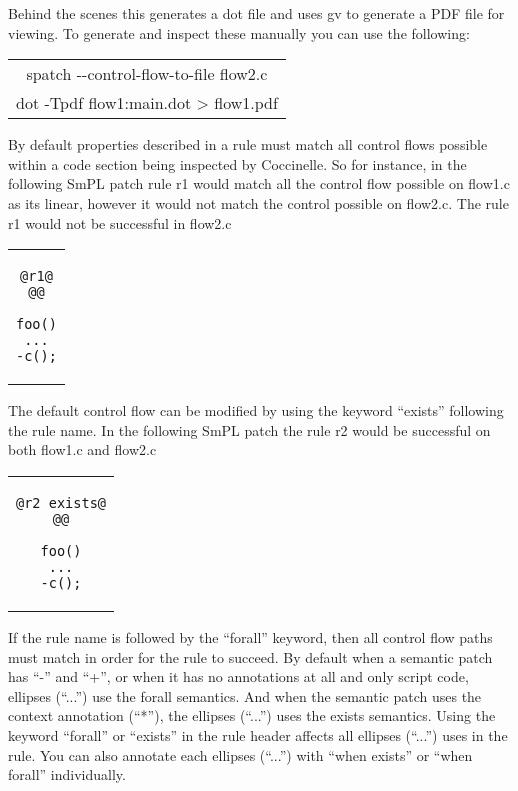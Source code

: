 Behind the scenes this generates a dot file and uses gv to generate
a PDF file for viewing. To generate and inspect these manually you
can use the following:

\begin{center}
\begin{tabular}{c}
spatch -{}-control-flow-to-file flow2.c \\
dot -Tpdf flow1:main.dot > flow1.pdf
\end{tabular}
\end{center}

By default properties described in a rule must match all control
flows possible within a code section being inspected by Coccinelle.
So for instance, in the following SmPL patch rule r1 would match all
the control flow possible on flow1.c as its linear, however it would
not match the control possible on flow2.c. The rule r1 would not
be successful in flow2.c

\begin{center}
\begin{tabular}{c}
\begin{lstlisting}[language=Cocci]
@r1@
@@

foo()
...
-c();

\end{lstlisting}\\
\end{tabular}
\end{center}

The default control flow can be modified by using the keyword ``exists''
following the rule name. In the following SmPL patch the rule r2 would
be successful on both flow1.c and flow2.c

\begin{center}
\begin{tabular}{c}
\begin{lstlisting}[language=Cocci]
@r2 exists@
@@

foo()
...
-c();

\end{lstlisting}\\
\end{tabular}
\end{center}

If the rule name is followed by the ``forall'' keyword, then all control flow
paths must match in order for the rule to succeed. By default when a
semantic patch has ``-'' and ``+'', or when it has no annotations at all and
only script code, ellipses (``...'') use the forall semantics.  And when the
semantic patch uses the context annotation (``*''), the ellipses (``...'') uses
the exists semantics.  Using the keyword ``forall'' or ``exists'' in the rule
header affects all ellipses (``...'') uses in the rule. You can also annotate
each ellipses (``...'') with ``when exists'' or ``when forall'' individually.

